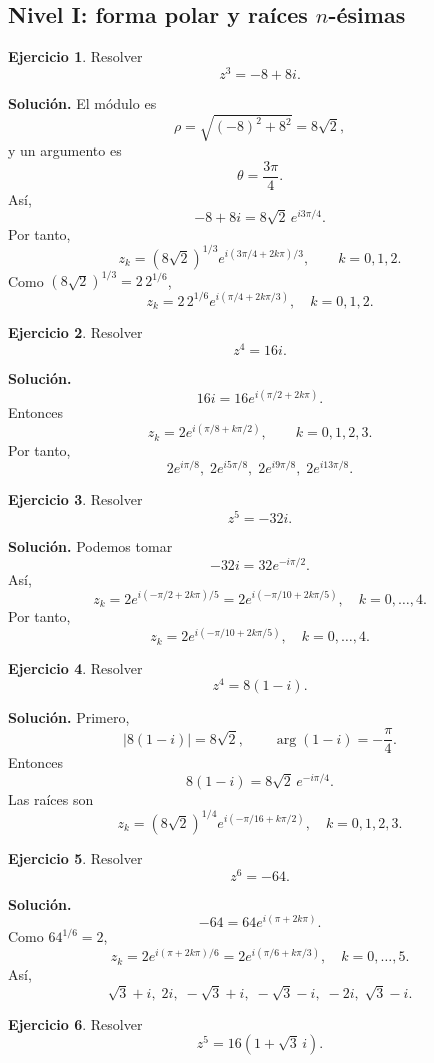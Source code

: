 \documentclass[12pt]{article}
\theoremstyle{definition}
\newtheorem{ejercicio}{Ejercicio}[section]
\theoremstyle{remark}
\begin{document}
\subsection{Nivel I: forma polar y raíces $n$-ésimas}

\begin{ejercicio}
Resolver
\[
z^3=-8+8i.
\]
\end{ejercicio}

\textbf{Solución.}
El módulo es
\[
\rho=\sqrt{(-8)^2+8^2}=8\sqrt2,
\]
y un argumento es
\[
\theta=\frac{3\pi}{4}.
\]
Así,
\[
-8+8i=8\sqrt2\,e^{i3\pi/4}.
\]
Por tanto,
\[
z_k=(8\sqrt2)^{1/3}
e^{i(3\pi/4+2k\pi)/3},\qquad k=0,1,2.
\]
Como $(8\sqrt2)^{1/3}=2\,2^{1/6}$,
\[
\boxed{
z_k=2\,2^{1/6}e^{i(\pi/4+2k\pi/3)},\quad k=0,1,2.
}
\]

\begin{ejercicio}
Resolver
\[
z^4=16i.
\]
\end{ejercicio}

\textbf{Solución.}
\[
16i=16e^{i(\pi/2+2k\pi)}.
\]
Entonces
\[
z_k=2e^{i(\pi/8+k\pi/2)},\qquad k=0,1,2,3.
\]
Por tanto,
\[
\boxed{
2e^{i\pi/8},\;
2e^{i5\pi/8},\;
2e^{i9\pi/8},\;
2e^{i13\pi/8}.
}
\]

\begin{ejercicio}
Resolver
\[
z^5=-32i.
\]
\end{ejercicio}

\textbf{Solución.}
Podemos tomar
\[
-32i=32e^{-i\pi/2}.
\]
Así,
\[
z_k=2e^{i(-\pi/2+2k\pi)/5}
=2e^{i(-\pi/10+2k\pi/5)},
\quad k=0,\ldots,4.
\]
Por tanto,
\[
\boxed{
z_k=2e^{i(-\pi/10+2k\pi/5)},\quad k=0,\ldots,4.
}
\]

\begin{ejercicio}
Resolver
\[
z^4=8(1-i).
\]
\end{ejercicio}

\textbf{Solución.}
Primero,
\[
|8(1-i)|=8\sqrt2,\qquad \arg(1-i)=-\frac{\pi}{4}.
\]
Entonces
\[
8(1-i)=8\sqrt2\,e^{-i\pi/4}.
\]
Las raíces son
\[
\boxed{
z_k=(8\sqrt2)^{1/4}
e^{i(-\pi/16+k\pi/2)},\quad k=0,1,2,3.
}
\]

\begin{ejercicio}
Resolver
\[
z^6=-64.
\]
\end{ejercicio}

\textbf{Solución.}
\[
-64=64e^{i(\pi+2k\pi)}.
\]
Como $64^{1/6}=2$,
\[
z_k=2e^{i(\pi+2k\pi)/6}
=2e^{i(\pi/6+k\pi/3)},
\quad k=0,\ldots,5.
\]
Así,
\[
\boxed{
\sqrt3+i,\;
2i,\;
-\sqrt3+i,\;
-\sqrt3-i,\;
-2i,\;
\sqrt3-i.
}
\]

\begin{ejercicio}
Resolver
\[
z^5=16(1+\sqrt3\,i).
\]
\end{ejercicio}
\end{document}
